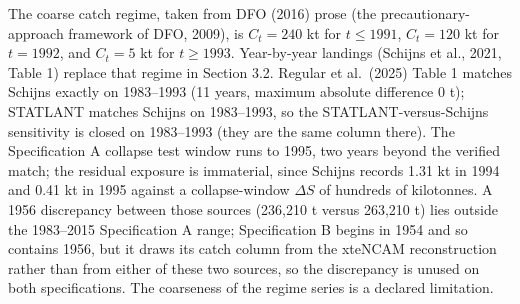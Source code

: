 \documentclass[11pt]{article}
\begin{document}
The coarse catch regime, taken from DFO (2016) prose (the
precautionary-approach framework of DFO, 2009), is \(C_t=240\) kt for
\(t\le 1991\), \(C_t=120\) kt for \(t=1992\), and \(C_t=5\) kt for
\(t\ge 1993\). Year-by-year landings (Schijns et al., 2021, Table 1)
replace that regime in Section 3.2. Regular et al.~(2025) Table 1
matches Schijns exactly on 1983--1993 (11 years, maximum absolute
difference 0 t); STATLANT matches Schijns on 1983--1993, so the
STATLANT-versus-Schijns sensitivity is closed on 1983--1993 (they are
the same column there). The Specification A collapse test window runs to
1995, two years beyond the verified match; the residual exposure is
immaterial, since Schijns records 1.31 kt in 1994 and 0.41 kt in 1995
against a collapse-window \(\Delta S\) of hundreds of kilotonnes. A
1956 discrepancy between those sources (236,210 t versus 263,210 t) lies
outside the 1983--2015 Specification A range; Specification B begins in
1954 and so contains 1956, but it draws its catch column from the
xteNCAM reconstruction rather than from either of these two sources, so
the discrepancy is unused on both specifications. The coarseness of the regime series is a declared limitation.
\end{document}
